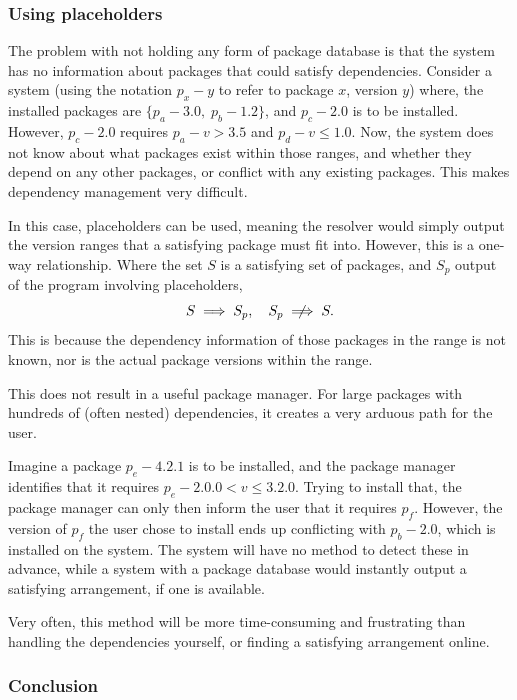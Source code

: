 \documentclass[10pt]{article}
\begin{document}
\subsubsection{Using placeholders}

The problem with not holding any form of package database is that the system has no information about packages that could satisfy dependencies. Consider a system (using the notation $p_x-y$ to refer to package $x$, version $y$) where, the installed packages are $\{p_a-3.0, \; p_b-1.2\}$, and $p_c-2.0$ is to be installed. However, $p_c-2.0$ requires $p_a-v>3.5$ and $p_d-v\le1.0$. Now, the system does not know about what packages exist within those ranges, and whether they depend on any other packages, or conflict with any existing packages. This makes dependency management very difficult. 

In this case, placeholders can be used, meaning the resolver would simply output the version ranges that a satisfying package must fit into. However, this is a one-way relationship. Where the set $S$ is a satisfying set of packages, and $S_p$ output of the program involving placeholders,
\begin{equation}
    S \implies S_p, \quad S_p \centernot\implies S.
\end{equation}
This is because the dependency information of those packages in the range is not known, nor is the actual package versions within the range. 

This does not result in a useful package manager. For large packages with hundreds of (often nested) dependencies, it creates a very arduous path for the user.

Imagine a package $p_e-4.2.1$ is to be installed, and the package manager identifies that it requires $p_e-2.0.0<v\le3.2.0$. Trying to install that, the package manager can only then inform the user that it requires $p_f$. However, the version of $p_f$ the user chose to install ends up conflicting with $p_b-2.0$, which is installed on the system. The system will have no method to detect these in advance, while a system with a package database would instantly output a satisfying arrangement, if one is available.

Very often, this method will be more time-consuming and frustrating than handling the dependencies yourself, or finding a satisfying arrangement online.

\subsubsection{Conclusion}
\end{document}
